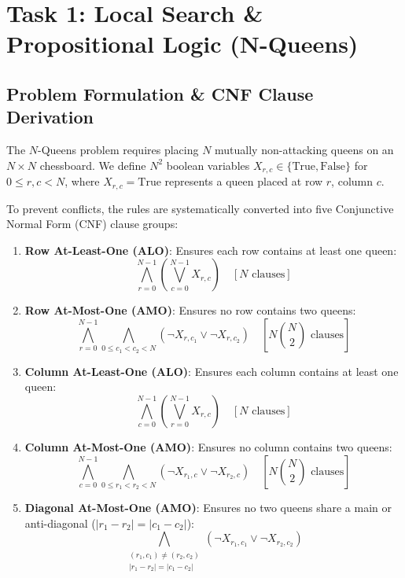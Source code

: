 \documentclass[conference]{IEEEtran}
\begin{document}
\section{Task 1: Local Search \& Propositional Logic (N-Queens)}

\subsection{Problem Formulation \& CNF Clause Derivation}
The $N$-Queens problem requires placing $N$ mutually non-attacking queens on an $N \times N$ chessboard. We define $N^2$ boolean variables $X_{r, c} \in \{\text{True}, \text{False}\}$ for $0 \le r, c < N$, where $X_{r, c} = \text{True}$ represents a queen placed at row $r$, column $c$.

To prevent conflicts, the rules are systematically converted into five Conjunctive Normal Form (CNF) clause groups:
\begin{enumerate}
    \item \textbf{Row At-Least-One (ALO)}: Ensures each row contains at least one queen:
    \begin{equation}
        \bigwedge_{r=0}^{N-1} \left( \bigvee_{c=0}^{N-1} X_{r, c} \right) \quad [N \text{ clauses}]
    \end{equation}
    \item \textbf{Row At-Most-One (AMO)}: Ensures no row contains two queens:
    \begin{equation}
        \bigwedge_{r=0}^{N-1} \bigwedge_{0 \le c_1 < c_2 < N} (\neg X_{r, c_1} \lor \neg X_{r, c_2}) \quad \left[ N \binom{N}{2} \text{ clauses} \right]
    \end{equation}
    \item \textbf{Column At-Least-One (ALO)}: Ensures each column contains at least one queen:
    \begin{equation}
        \bigwedge_{c=0}^{N-1} \left( \bigvee_{r=0}^{N-1} X_{r, c} \right) \quad [N \text{ clauses}]
    \end{equation}
    \item \textbf{Column At-Most-One (AMO)}: Ensures no column contains two queens:
    \begin{equation}
        \bigwedge_{c=0}^{N-1} \bigwedge_{0 \le r_1 < r_2 < N} (\neg X_{r_1, c} \lor \neg X_{r_2, c}) \quad \left[ N \binom{N}{2} \text{ clauses} \right]
    \end{equation}
    \item \textbf{Diagonal At-Most-One (AMO)}: Ensures no two queens share a main or anti-diagonal ($|r_1 - r_2| = |c_1 - c_2|$):
    \begin{equation}
        \bigwedge_{\substack{(r_1, c_1) \neq (r_2, c_2) \\ |r_1 - r_2| = |c_1 - c_2|}} (\neg X_{r_1, c_1} \lor \neg X_{r_2, c_2})
    \end{equation}
\end{enumerate}
\end{document}

